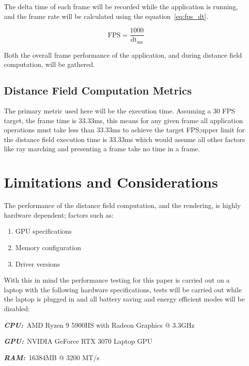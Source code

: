 The delta time of each frame will be recorded while the application is running, and the frame rate will be calculated
using the equation~\ref{eq:fps_dt}.

\begin{equation}\label{eq:fps_dt}
    \text{FPS} = \frac{1000}{\text{dt}_{\text{ms}}}
\end{equation}

Both the overall frame performance of the application, and during distance field computation, will be gathered.

\subsection{Distance Field Computation Metrics}\label{sec:distance_field_metrics}
The primary metric used here will be the execution time. Assuming a 30 FPS target, the frame time is 33.33ms, this means
for any given frame all application operations must take less than 33.33ms to achieve the target FPS;\@the upper
limit for the distance field execution time is 33.33ms which would assume all other factors like ray marching and
presenting a frame take no time in a frame.

\section{Limitations and Considerations}
The performance of the distance field computation, and the rendering, is highly hardware dependent; factors such as:

\begin{enumerate}
    \item GPU specifications
    \item Memory configuration
    \item Driver versions
\end{enumerate}

With this in mind the performance testing for this paper is carried out on a laptop with the following hardware
specifications, tests will be carried out while the laptop is plugged in and all battery saving and energy efficient
modes will be disabled:

\begin{description}
    \item \textbf{\textit{CPU:}}~AMD Ryzen 9 5900HS with Radeon Graphics @ 3.3GHz
    \item \textbf{\textit{GPU:}}~NVIDIA GeForce RTX 3070 Laptop GPU
    \item \textbf{\textit{RAM:}}~16384MB @ 3200 MT/s
\end{description}
